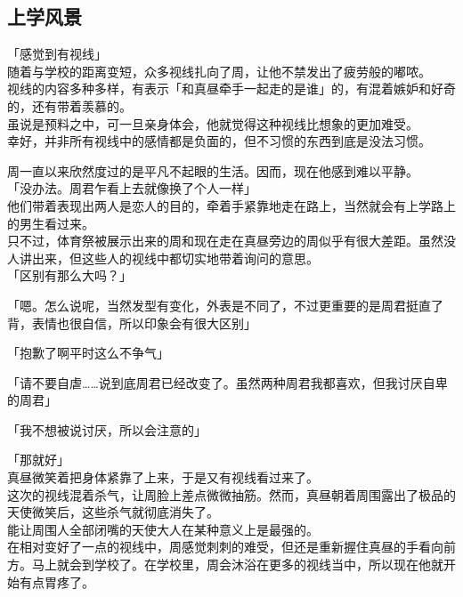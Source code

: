 \subsection{上学风景}

「感觉到有视线」\\

随着与学校的距离变短，众多视线扎向了周，让他不禁发出了疲劳般的嘟哝。\\

视线的内容多种多样，有表示「和真昼牵手一起走的是谁」的，有混着嫉妒和好奇的，还有带着羡慕的。\\

虽说是预料之中，可一旦亲身体会，他就觉得这种视线比想象的更加难受。\\

幸好，并非所有视线中的感情都是负面的，但不习惯的东西到底是没法习惯。

周一直以来欣然度过的是平凡不起眼的生活。因而，现在他感到难以平静。\\

「没办法。周君乍看上去就像换了个人一样」\\

他们带着表现出两人是恋人的目的，牵着手紧靠地走在路上，当然就会有上学路上的男生看过来。\\

只不过，体育祭被展示出来的周和现在走在真昼旁边的周似乎有很大差距。虽然没人讲出来，但这些人的视线中都切实地带着询问的意思。\\

「区别有那么大吗？」

「嗯。怎么说呢，当然发型有变化，外表是不同了，不过更重要的是周君挺直了背，表情也很自信，所以印象会有很大区别」

「抱歉了啊平时这么不争气」

「请不要自虐……说到底周君已经改变了。虽然两种周君我都喜欢，但我讨厌自卑的周君」

「我不想被说讨厌，所以会注意的」

「那就好」\\

真昼微笑着把身体紧靠了上来，于是又有视线看过来了。\\

这次的视线混着杀气，让周脸上差点微微抽筋。然而，真昼朝着周围露出了极品的天使微笑后，这些杀气就彻底消失了。\\

能让周围人全部闭嘴的天使大人在某种意义上是最强的。\\

在相对变好了一点的视线中，周感觉刺刺的难受，但还是重新握住真昼的手看向前方。马上就会到学校了。在学校里，周会沐浴在更多的视线当中，所以现在他就开始有点胃疼了。\\

